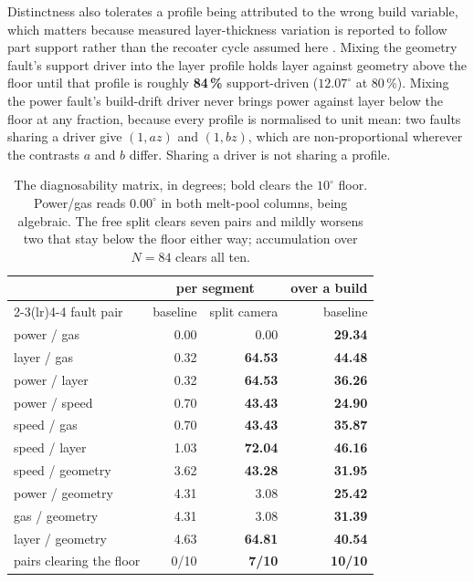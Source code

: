 \documentclass[final,5p,times,twocolumn]{elsarticle}
\begin{document}
Distinctness also tolerates a profile being attributed to the wrong build
variable, which matters because measured layer-thickness variation is reported
to follow part support rather than the recoater cycle assumed here
\cite{Liu2022}. Mixing the geometry fault's support driver into the layer
profile holds layer against geometry above the floor until that profile is
roughly \textbf{84\,\%} support-driven ($12.07^\circ$ at 80\,\%). Mixing the
power fault's build-drift driver never brings power against layer below the
floor at any fraction, because every profile is normalised to unit mean: two
faults sharing a driver give $(1, a z)$ and $(1, b z)$, which are
non-proportional wherever the contrasts $a$ and $b$ differ. Sharing a driver is
not sharing a profile.

\begin{table}[htbp]
\centering
\caption{The diagnosability matrix, in degrees; bold clears the $10^\circ$ floor.
Power/gas reads $0.00^\circ$ in both melt-pool columns, being algebraic. The free
split clears seven pairs and mildly worsens two that stay below the floor either
way; accumulation over $N=84$ clears all ten.}
\label{tab:matrix}
\scriptsize
\begin{tabular}{@{}lrrr@{}}
\toprule
 & \multicolumn{2}{c}{per segment} & over a build \\
\cmidrule(lr){2-3}\cmidrule(lr){4-4}
fault pair & baseline & split camera & baseline \\
\midrule
power / gas      & 0.00 & 0.00 & \textbf{29.34} \\
layer / gas      & 0.32 & \textbf{64.53} & \textbf{44.48} \\
power / layer    & 0.32 & \textbf{64.53} & \textbf{36.26} \\
power / speed    & 0.70 & \textbf{43.43} & \textbf{24.90} \\
speed / gas      & 0.70 & \textbf{43.43} & \textbf{35.87} \\
speed / layer    & 1.03 & \textbf{72.04} & \textbf{46.16} \\
speed / geometry & 3.62 & \textbf{43.28} & \textbf{31.95} \\
power / geometry & 4.31 & 3.08 & \textbf{25.42} \\
gas / geometry   & 4.31 & 3.08 & \textbf{31.39} \\
layer / geometry & 4.63 & \textbf{64.81} & \textbf{40.54} \\
\midrule
pairs clearing the floor & 0/10 & \textbf{7/10} & \textbf{10/10} \\
\bottomrule
\end{tabular}
\end{table}
\end{document}

